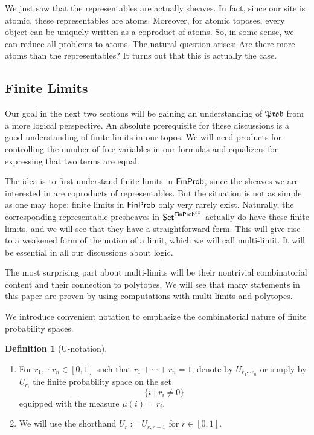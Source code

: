 \documentclass[a4paper]{amsproc}
\theoremstyle{plain}
\theoremstyle{definition}
\newtheorem{definition}[theorem]{Definition}
\theoremstyle{remark}
\numberwithin{equation}{section}
\newcommand{\Set}{\textup{\textsf{Set}}}
\newcommand{\FinProb}{\textup{\textsf{FinProb}}}
\newcommand{\Prob}{\mathfrak{Prob}}
\begin{document}
We just saw that the representables are actually sheaves. In fact, since our site is atomic, these representables are atoms. Moreover, for atomic toposes, every object can be uniquely written as a coproduct of atoms. So, in some sense, we can reduce all problems to atoms. The natural question arises: Are there more atoms than the representables? It turns out that this is actually the case.



\subsection{Finite Limits}

Our goal in the next two sections will be gaining an understanding of $\Prob$ from a more logical perspective. An absolute prerequisite for these discussions is a good understanding of finite limits in our topos. We will need products for controlling the number of free variables in our formulas and equalizers for expressing that two terms are equal.

The idea is to first understand finite limits in $\FinProb$, since the sheaves we are interested in are coproducts of representables. But the situation is not as simple as one may hope: finite limits in $\FinProb$ only very rarely exist. Naturally, the corresponding representable presheaves in $\Set^{\FinProb^{op}}$ actually do have these finite limits, and we will see that they have a straightforward form. This will give rise to a weakened form of the notion of a limit, which we will call multi-limit. It will be essential in all our discussions about logic.

The most surprising part about multi-limits will be their nontrivial combinatorial content and their connection to polytopes. We will see that many statements in this paper are proven by using computations with multi-limits and polytopes.

We introduce convenient notation to emphasize the combinatorial nature of finite probability spaces.

\begin{definition}[U-notation] \label{U-notation}
    \mbox{}
    \begin{enumerate}
        \item For $r_1, \cdots r_n \in [0,1]$ such that $r_1 + \cdots + r_n = 1$, denote by $U_{r_1 \cdots r_n}$ or simply by $U_{r_i}$ the finite probability space on the set
        \[
        \{i \mid r_i \neq 0 \}
        \]
        equipped with the measure $\mu(i) = r_i$.
        \item We will use the shorthand $U_r := U_{r,r-1}$ for $r \in [0,1]$.
    \end{enumerate}
\end{definition}
\end{document}

